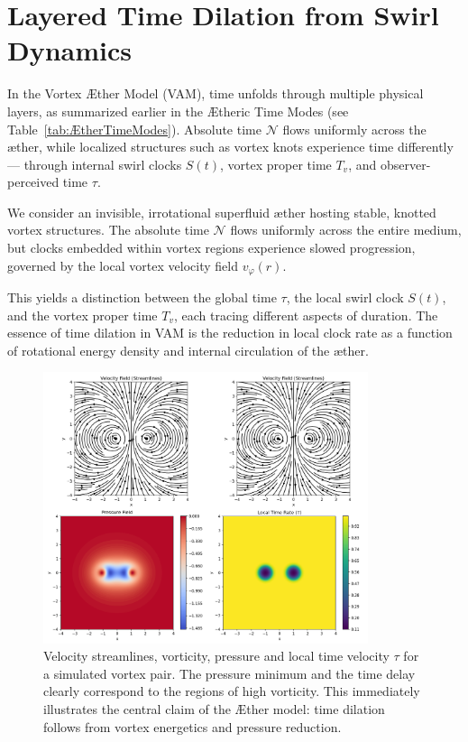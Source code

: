 \section{Layered Time Dilation from Swirl Dynamics}

In the Vortex Æther Model (VAM), time unfolds through multiple physical layers, as summarized earlier in the Ætheric Time Modes (see Table~\ref{tab:ÆtherTimeModes}). Absolute time \(\mathcal{N}\) flows uniformly across the æther, while localized structures such as vortex knots experience time differently — through internal swirl clocks \(S(t)\), vortex proper time \(T_v\), and observer-perceived time \(\tau\).


We consider an invisible, irrotational superfluid æther hosting stable, knotted vortex structures. The absolute time \(\mathcal{N}\) flows uniformly across the entire medium, but clocks embedded within vortex regions experience slowed progression, governed by the local vortex velocity field \(v_\varphi(r)\).

This yields a distinction between the global time \(\tau\), the local swirl clock \(S(t)\), and the vortex proper time \(T_v\), each tracing different aspects of duration. The essence of time dilation in VAM is the reduction in local clock rate as a function of rotational energy density and internal circulation of the æther.


\begin{figure}[htbp]
    \centering
    \includegraphics[width=0.85\textwidth]{images/01-streamlinesDiPole}
    \caption{Velocity streamlines, vorticity, pressure and local time velocity $\tau$ for a simulated vortex pair. The pressure minimum and the time delay clearly correspond to the regions of high vorticity. This immediately illustrates the central claim of the Æther model: time dilation follows from vortex energetics and pressure reduction.}
    \label{fig:vortexfields}
\end{figure}

